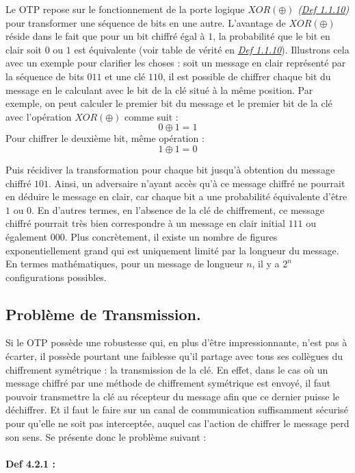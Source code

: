 \documentclass{article}
\begin{document}
Le OTP repose sur le fonctionnement
de la porte logique \(XOR (\oplus)\)
\textit{(\hyperref[def-1.1.10]{Def 1.1.10})} pour transformer une
séquence de bits en une autre. L'avantage de \(XOR (\oplus)\) réside
dans le fait que pour un bit chiffré égal à \(1\), la probabilité que le
bit en clair soit \(0\) ou \(1\) est équivalente (voir table de vérité
en \textit{\hyperref[def-1.1.10]{Def 1.1.10}}). Illustrons cela avec un
exemple pour clarifier les choses : soit un message en clair représenté
par la séquence de bits \(011\) et une clé \(110\), il est
possible de chiffrer chaque bit du message en le calculant avec le bit
de la clé situé à la même position. Par exemple, on peut calculer le
premier bit du message et le premier bit de la clé avec l'opération
\(XOR (\oplus)\) comme suit : \[
0 \oplus 1 = 1
\] Pour chiffrer le deuxième bit, même opération : \[
1 \oplus 1 = 0
\] 

Puis récidiver la transformation pour chaque bit jusqu'à obtention du
message chiffré \(101\). Ainsi, un adversaire n'ayant accès qu'à ce
message chiffré ne pourrait en déduire le message en clair, car chaque
bit a une probabilité équivalente d'être \(1\) ou \(0\). En d'autres
termes, en l'absence de la clé de chiffrement, ce message chiffré
pourrait très bien correspondre à un message en clair initial
\(111\) ou également \(000\). Plus concrètement, il existe un
nombre de figures exponentiellement grand qui est uniquement limité par
la longueur du message. En termes mathématiques, pour un message de
longueur \(n\), il y a \(2^n\) configurations possibles.

\newpage

\subsection{Problème de Transmission.}

Si le OTP possède une robustesse qui, en plus d'être impressionnante,
n'est pas à écarter, il possède pourtant une faiblesse qu'il partage
avec tous ses collègues du chiffrement symétrique : la transmission de
la clé. En effet, dans le cas où un message chiffré par une méthode de
chiffrement symétrique est envoyé, il faut pouvoir transmettre la clé au
récepteur du message afin que ce dernier puisse le déchiffrer. Et il
faut le faire sur un canal de communication suffisamment sécurisé pour
qu'elle ne soit pas interceptée, auquel cas l'action de chiffrer le
message perd son sens. Se présente donc le problème suivant :

\paragraph{Def 4.2.1 :}\label{def-4.2.1}
\end{document}
